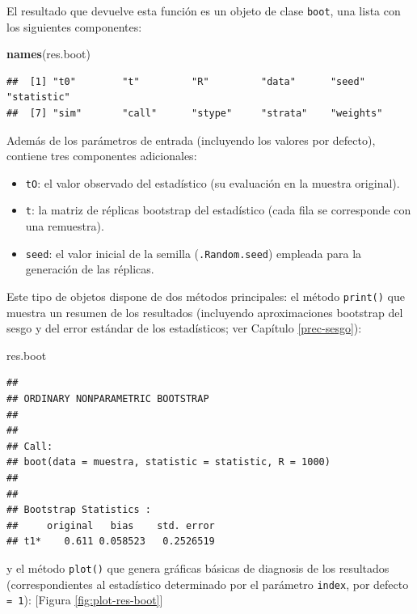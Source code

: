 \documentclass[
]{book}
\newenvironment{Shaded}{\begin{snugshade}}{\end{snugshade}}
\newcommand{\FunctionTok}[1]{\textcolor[rgb]{0.13,0.29,0.53}{\textbf{#1}}}
\newcommand{\NormalTok}[1]{#1}
\theoremstyle{break}
\theoremstyle{nonumberplain}
\begin{document}
El resultado que devuelve esta función es un objeto de clase \texttt{boot}, una lista con los siguientes componentes:

\begin{Shaded}
\begin{Highlighting}[]
\FunctionTok{names}\NormalTok{(res.boot)}
\end{Highlighting}
\end{Shaded}

\begin{verbatim}
##  [1] "t0"        "t"         "R"         "data"      "seed"      "statistic"
##  [7] "sim"       "call"      "stype"     "strata"    "weights"
\end{verbatim}

Además de los parámetros de entrada (incluyendo los valores por defecto), contiene tres componentes adicionales:

\begin{itemize}
\item
  \texttt{tO}: el valor observado del estadístico
  (su evaluación en la muestra original).
\item
  \texttt{t}: la matriz de réplicas bootstrap del estadístico
  (cada fila se corresponde con una remuestra).
\item
  \texttt{seed}: el valor inicial de la semilla (\texttt{.Random.seed})
  empleada para la generación de las réplicas.
\end{itemize}

Este tipo de objetos dispone de dos métodos principales:
el método \texttt{print()} que muestra un resumen de los resultados
(incluyendo aproximaciones bootstrap del sesgo y del error
estándar de los estadísticos; ver Capítulo \ref{prec-sesgo}):

\begin{Shaded}
\begin{Highlighting}[]
\NormalTok{res.boot}
\end{Highlighting}
\end{Shaded}

\begin{verbatim}
## 
## ORDINARY NONPARAMETRIC BOOTSTRAP
## 
## 
## Call:
## boot(data = muestra, statistic = statistic, R = 1000)
## 
## 
## Bootstrap Statistics :
##     original   bias    std. error
## t1*    0.611 0.058523   0.2526519
\end{verbatim}

y el método \texttt{plot()} que genera gráficas básicas de diagnosis
de los resultados (correspondientes al estadístico determinado por el parámetro \texttt{index}, por defecto \texttt{=\ 1}): {[}Figura \ref{fig:plot-res-boot}{]}
\end{document}
